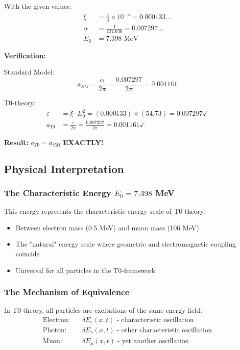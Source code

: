 \documentclass[12pt,a4paper]{article}
\numberwithin{equation}{section}
\newcommand{\xipar}{\xi}
\begin{document}
	With the given values:
	\begin{align}
		\xipar &= \frac{4}{3} \times 10^{-4} = 0.000133\ldots\\
		\alpha &= \frac{1}{137.036} = 0.007297\ldots\\
		E_0 &= 7.398 \text{ MeV}
	\end{align}
	
	\textbf{Verification:}
	
	Standard Model:
	\begin{equation}
		a_{SM} = \frac{\alpha}{2\pi} = \frac{0.007297}{2\pi} = 0.001161
	\end{equation}
	
	T0-theory:
	\begin{align}
		\varepsilon &= \xipar \cdot E_0^2 = (0.000133) \times (54.73) = 0.007297 \checkmark\\
		a_{T0} &= \frac{\varepsilon}{2\pi} = \frac{0.007297}{2\pi} = 0.001161 \checkmark
	\end{align}
	
	\textbf{Result:} $a_{T0} = a_{SM}$ \textbf{EXACTLY!}
	
	\subsection{Physical Interpretation}
	
	\subsubsection{The Characteristic Energy $E_0 = 7.398$ MeV}
	
	This energy represents the characteristic energy scale of T0-theory:
	\begin{itemize}
		\item Between electron mass (0.5 MeV) and muon mass (106 MeV)
		\item The "natural" energy scale where geometric and electromagnetic coupling coincide
		\item Universal for all particles in the T0-framework
	\end{itemize}
	
	\subsubsection{The Mechanism of Equivalence}
	
	In T0-theory, all particles are excitations of the same energy field:
	\begin{align}
		\text{Electron:} &\quad \delta E_e(x,t) \text{ - characteristic oscillation}\\
		\text{Photon:} &\quad \delta E_\gamma(x,t) \text{ - other characteristic oscillation}\\
		\text{Muon:} &\quad \delta E_\mu(x,t) \text{ - yet another oscillation}
	\end{align}
	
\end{document}
